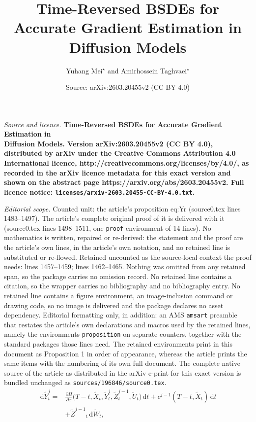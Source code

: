 \documentclass[10pt,a4paper]{amsart}
\title{\LARGE \bf Time-Reversed BSDEs for Accurate Gradient Estimation in\\ Diffusion Models}
\author{Yuhang Mei$^\star$ and Amirhossein Taghvaei$^\star$ {}}
\date{Source: arXiv:2603.20455v2 (CC BY 4.0)}
\newcommand{\Ur}{\tilde U}
\newcommand{\Xr}{\tilde X}
\newcommand{\Yr}{\tilde Y}
\newcommand{\Zr}{\tilde Z}
\newcommand{\ud}{\,\mathrm{d}}
\begin{document}
\maketitle

\noindent\emph{Source and licence.} \LARGE \bf Time-Reversed BSDEs for Accurate Gradient Estimation in\\ Diffusion Models. Version arXiv:2603.20455v2 (CC BY 4.0), distributed by arXiv under the Creative Commons Attribution 4.0 International licence, http://creativecommons.org/licenses/by/4.0/, as recorded in the arXiv licence metadata for this exact version and shown on the abstract page https://arxiv.org/abs/2603.20455v2. Full licence notice: \texttt{licenses/arxiv-2603.20455-CC-BY-4.0.txt}.\par\smallskip

\noindent\textit{Editorial scope.} Counted unit: the article's proposition eq:Yr (source0.tex lines 1483--1497). The article's complete original proof of it is delivered with it (source0.tex lines 1498--1511, one \texttt{proof} environment of 14 lines). No mathematics is written, repaired or re-derived: the statement and the proof are the article's own lines, in the article's own notation, and no retained line is substituted or re-flowed.  Retained uncounted as the source-local context the proof needs: lines 1457--1459; lines 1462--1465.  Nothing was omitted from any retained span, so the package carries no omission record.  No retained line contains a citation, so the wrapper carries no bibliography and no bibliography entry.  No retained line contains a figure environment, an image-inclusion command or drawing code, so no image is delivered and the package declares no asset dependency.  Editorial formatting only, in addition: an AMS \texttt{amsart} preamble that restates the article's own declarations and macros used by the retained lines, namely the environments \texttt{proposition} on separate counters, together with the standard packages those lines need.  The retained environments print in this document as Proposition 1 in order of appearance, whereas the article prints the same items with the numbering of its own full document.  The complete native source of the article as distributed in the arXiv e-print for this exact version is bundled unchanged as \texttt{sources/196846/source0.tex}.
\begin{align}\nonumber
    \ud \Yr^j_t = &\frac{\partial H}{\partial x}\big(T\!-\!t,\Xr_t,\Yr^j_t,\Zr^{j-1}_t,\Ur_t\big)\ud t \!+\! c^{j-1}(T\!-\!t,\Xr_t)\ud t \\&+ {\Zr^{j-1}}_t \ud \tilde W_t,\label{eq:tr-bsde-j}
\end{align}
\end{document}
